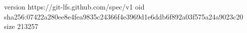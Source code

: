 version https://git-lfs.github.com/spec/v1
oid sha256:07422a280ee8e4fea9835c24366f4e3969d1e6ddb6f892a03f575a24a9023c20
size 213257
